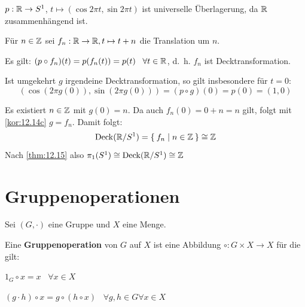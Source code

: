 \begin{beispiel}
    $p: \mathbb{R} \rightarrow S^1$, $t \mapsto (\cos 2 \pi t, \sin 2 \pi t)$
    ist universelle Überlagerung, da $\mathbb{R}$ zusammenhängend ist.

    Für $n \in \mathbb{Z}$ sei $f_n: \mathbb{R} \rightarrow \mathbb{R}, t \mapsto t + n$
    die Translation um $n$.

    Es gilt: $(p \circ f_n)(t) = p(f_n(t)) = p(t) \;\;\; \forall t \in \mathbb{R}$,
    d.~h. $f_n$ ist Decktransformation.

    Ist umgekehrt $g$ irgendeine Decktransformation, so gilt insbesondere
    für $t=0$:
    \[(\cos(2 \pi g(0)), \sin(2 \pi g(0))) = (p \circ g)(0) = p(0) = (1,0)\]

    Es existiert $n \in \mathbb{Z}$ mit $g(0) = n$. Da auch $f_n(0) = 0 + n = n$
    gilt, folgt mit \cref{kor:12.14c} $g = f_n$. Damit folgt:
    \[\operatorname{Deck}(\mathbb{R}/S^1) = \Set{f_n | n \in \ensuremath{\mathbb{Z}}} \cong \mathbb{Z}\]
    Nach \cref{thm:12.15} also $\pi_1(S^1) \cong \operatorname{Deck}(\mathbb{R}/S^1) \cong \mathbb{Z}$
\end{beispiel}

\section{Gruppenoperationen}
\begin{definition}%
    Sei $(G, \cdot)$ eine Gruppe und $X$ eine Menge.

    Eine \textbf{Gruppenoperation} von $G$ auf
    $X$ ist eine Abbildung $\circ: G \times X \rightarrow X$ für die gilt:
    \begin{defenum}
        \item $1_G \circ x = x \;\;\; \forall x \in X$\label{def:gruppenoperation.1}
        \item $(g \cdot h) \circ x = g \circ (h \circ x) \;\;\; \forall g,h \in G \forall x \in X$\label{def:gruppenoperation.2}
    \end{defenum}
\end{definition}


